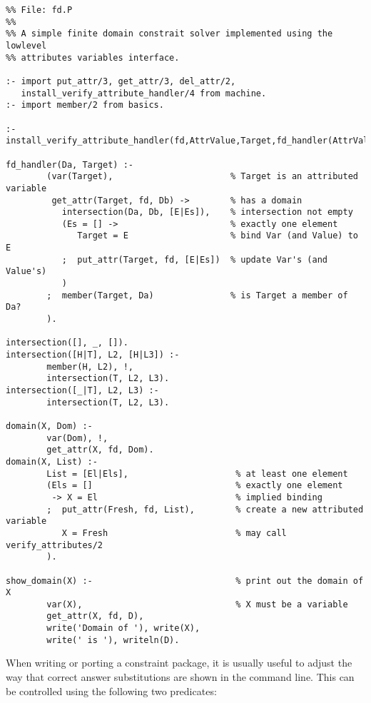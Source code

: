 \begin{small}
\begin{verbatim}
%% File: fd.P
%%
%% A simple finite domain constrait solver implemented using the lowlevel 
%% attributes variables interface.  

:- import put_attr/3, get_attr/3, del_attr/2, 
   install_verify_attribute_handler/4 from machine.
:- import member/2 from basics.

:- install_verify_attribute_handler(fd,AttrValue,Target,fd_handler(AttrValue,Target)).

fd_handler(Da, Target) :-
        (var(Target),                       % Target is an attributed variable
         get_attr(Target, fd, Db) ->        % has a domain
           intersection(Da, Db, [E|Es]),    % intersection not empty
           (Es = [] ->                      % exactly one element
              Target = E                    % bind Var (and Value) to E
           ;  put_attr(Target, fd, [E|Es])  % update Var's (and Value's)
           )
        ;  member(Target, Da)               % is Target a member of Da?
        ).

intersection([], _, []).
intersection([H|T], L2, [H|L3]) :-
        member(H, L2), !,
        intersection(T, L2, L3).
intersection([_|T], L2, L3) :-
        intersection(T, L2, L3).

domain(X, Dom) :- 
        var(Dom), !, 
        get_attr(X, fd, Dom). 
domain(X, List) :- 
        List = [El|Els],                     % at least one element 
        (Els = []                            % exactly one element
         -> X = El                           % implied binding 
        ;  put_attr(Fresh, fd, List),        % create a new attributed variable
           X = Fresh                         % may call verify_attributes/2
        ).

show_domain(X) :-                            % print out the domain of X
        var(X),                              % X must be a variable
        get_attr(X, fd, D),
        write('Domain of '), write(X),
        write(' is '), writeln(D).

\end{verbatim}
\end{small}

When writing or porting a constraint package, it is usually useful to
adjust the way that correct answer substitutions are shown in the
command line.  This can be controlled using the following two predicates:

